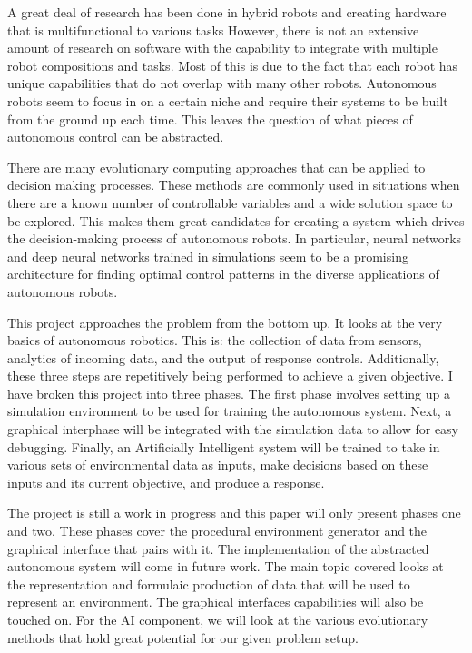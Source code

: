 \documentclass[]{report}
\begin{document}
A great deal of research has been done in hybrid robots and creating hardware that is multifunctional to various tasks
However, there is not an extensive amount of research on software with the capability to integrate with multiple robot compositions and tasks.
Most of this is due to the fact that each robot has unique capabilities that do not overlap with many other robots.
Autonomous robots seem to focus in on a certain niche and require their systems to be built from the ground up each time.
This leaves the question of what pieces of autonomous control can be abstracted.

There are many evolutionary computing approaches that can be applied to decision making processes.
These methods are commonly used in situations when there are a known number of controllable variables and a wide solution space to be explored.
This makes them great candidates for creating a system which drives the decision-making process of autonomous robots.
In particular, neural networks and deep neural networks trained in simulations seem to be a promising architecture for finding optimal control patterns in the diverse applications of autonomous robots.

This project approaches the problem from the bottom up.
It looks at the very basics of autonomous robotics.
This is: the collection of data from sensors, analytics of incoming data, and the output of response controls.
Additionally, these three steps are repetitively being performed to achieve a given objective.
I have broken this project into three phases.
The first phase involves setting up a simulation environment to be used for training the autonomous system.
Next, a graphical interphase will be integrated with the simulation data to allow for easy debugging.
Finally, an Artificially Intelligent system will be trained to take in various sets of environmental data as inputs, make decisions based on these inputs and its current objective, and produce a response.

The project is still a work in progress and this paper will only present phases one and two.
These phases cover the procedural environment generator and the graphical interface that pairs with it.
The implementation of the abstracted autonomous system will come in future work.
The main topic covered looks at the representation and formulaic production of data that will be used to represent an environment.
The graphical interfaces capabilities will also be touched on.
For the AI component, we will look at the various evolutionary methods that hold great potential for our given problem setup.
\end{document}
